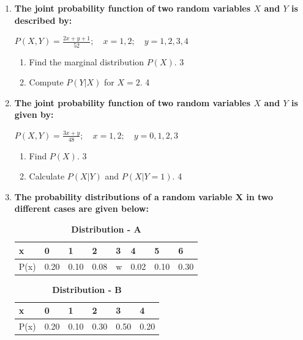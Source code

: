 \documentclass[a4paper,oneside, margin=1.4in]{book}
\begin{document}
\begin{enumerate}
  \item
  \textbf{The joint probability function of two random variables \( X \) and \( Y \) is described by:}
  
  \begin{center}
  \( \displaystyle P(X,Y) = \frac{2x + y + 1}{52}; \quad x = 1, 2; \quad y = 1, 2, 3, 4 \)
  \end{center}
 
  \begin{enumerate}
    \item
    	Find the marginal distribution \( P(X) \). \hfill 3
    \item
     	Compute \( P(Y \vert X) \) for \( X = 2 \). \hfill 4
  \end{enumerate}
  
  \item
  \textbf{The joint probability function of two random variables \( X \) and \( Y \) is given by:}
  
  \begin{center}
  \( \displaystyle P(X,Y) = \frac{3x + y}{48}; \quad x = 1, 2; \quad y = 0, 1, 2, 3 \)
  \end{center}
 
  \begin{enumerate}
    \item
    	Find \( P(X) \). \hfill 3
    \item
     	Calculate \( P(X \vert Y) \) and \( P(X \vert Y=1) \). \hfill 4
  \end{enumerate}



   \item
	  \textbf{The probability distributions of a random variable X in two different cases are given below:} 
	  
	  \begin{table}[!ht]
	  \caption {\textbf{Distribution - A}}
	   \begin{center}
\begin{tabular}{llllllll}
x    & 0    & 1    & 2    & 3 & 4    & 5    & 6    \\  \hline
P(x) & 0.20 & 0.10 & 0.08 & w & 0.02 & 0.10 & 0.30
\end{tabular}
 \end{center}
\end{table}

\begin{table}[h]
	  \caption {\textbf{Distribution - B}}
	   \begin{center}
\begin{tabular}{llllll}
x    & 0    & 1    & 2    & 3    & 4 \\ \hline
P(x) & 0.20 & 0.10 & 0.30 & 0.50 & 0.20   
\end{tabular}
\end{center}
\end{table}
  

\end{enumerate}
\end{document}
